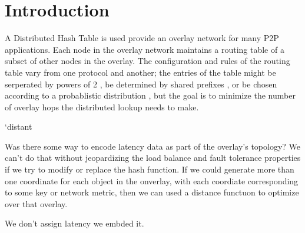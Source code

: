 \documentclass{IEEEtran}
\begin{document}
\section{Introduction}
A Distributed Hash Table is used provide an overlay network for many P2P applications. %
Each node in the overlay network maintains a routing table of a subset of other nodes in the overlay.  
The configuration and rules of the routing table vary from one protocol and another;  the entries of the table might be serperated by powers of 2 \cite{Chord}, be determined by shared prefixes \cite{pastry}, or be chosen according to a probablistic distribution \cite{kleinberg2000navigation}, but the goal is to  minimize the number of overlay hops the distributed lookup needs to make.


`distant 

Was there some way to encode latency data as part of the overlay's topology? We can't do that without jeopardizing the load balance and fault tolerance properties if we try to modify or replace the hash function.  If we could generate more than one coordinate for each object in the onverlay, with each coordiate corresponding to some key or network metric, then we can used a distance functuon to optimize over that overlay.

We don't assign latency we embded it.

\end{document}
